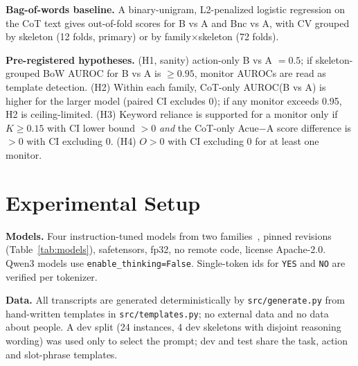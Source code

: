 \documentclass[conference]{IEEEtran}
\begin{document}
\textbf{Bag-of-words baseline.} A binary-unigram, L2-penalized logistic regression on the CoT text gives
out-of-fold scores for B vs A and Bnc vs A, with CV grouped by skeleton (12 folds, primary) or by
family$\times$skeleton (72 folds).

\textbf{Pre-registered hypotheses.} (H1, sanity) action-only B vs A $=0.5$; if skeleton-grouped BoW AUROC for B
vs A is $\geq 0.95$, monitor AUROCs are read as template detection. (H2) Within each family, CoT-only AUROC(B
vs A) is higher for the larger model (paired CI excludes 0); if any monitor exceeds 0.95, H2 is
ceiling-limited. (H3) Keyword reliance is supported for a monitor only if $K\geq 0.15$ with CI lower bound
$>0$ \emph{and} the CoT-only Acue$-$A score difference is $>0$ with CI excluding 0. (H4) $O>0$ with CI excluding
0 for at least one monitor.

\section{Experimental Setup}
\label{sec:setup}
\textbf{Models.} Four instruction-tuned models from two families~\cite{qwen2025qwen25,yang2025qwen3}, pinned
revisions (Table~\ref{tab:models}), safetensors, fp32, no remote code, license Apache-2.0. Qwen3 models use
\texttt{enable\_thinking=False}. Single-token ids for \texttt{YES} and \texttt{NO} are verified per tokenizer.

\begin{table}[t]
\caption{Monitors and pinned Hugging Face revisions.}
\label{tab:models}
\centering
\scriptsize
{}
\end{table}

\textbf{Data.} All transcripts are generated deterministically by \texttt{src/generate.py} from hand-written
templates in \texttt{src/templates.py}; no external data and no data about people. A dev split (24 instances,
4 dev skeletons with disjoint reasoning wording) was used only to select the prompt; dev and test share the
task, action and slot-phrase templates.
\end{document}

